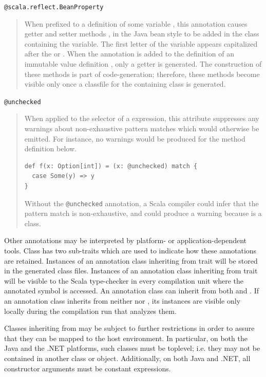 {\lstinline^@scala.reflect.BeanProperty^
\begin{quote}
When prefixed to a definition of some variable , this
annotation causes getter and setter methods , 
in the Java bean style to be added in the class containing the
variable. The first letter of the variable appears capitalized after
the  or . When the annotation is added to the
definition of an immutable value definition , only a getter is
generated. The construction of these methods is part of
code-generation; therefore, these methods become visible only once a
classfile for the containing class is generated.
\end{quote}

\lstinline^@unchecked^
\begin{quote}
When applied to the selector of a \lstinline@match@ expression,
this attribute suppresses any warnings about non-exhaustive pattern
matches which would otherwise be emitted. For instance, no warnings
would be produced for the method definition below.
\begin{lstlisting}
def f(x: Option[int]) = (x: @unchecked) match {
  case Some(y) => y
}
\end{lstlisting}
Without the \lstinline^@unchecked^ annotation, a Scala compiler could
infer that the pattern match is non-exhaustive, and could produce a
warning because \lstinline@Option@ is a \lstinline@sealed@ class.
\end{quote}

Other annotations may be interpreted by platform- or
application-dependent tools. Class  has two
sub-traits which are used to indicate how these annotations are
retained. Instances of an annotation class inheriting from trait
 will be stored in the generated class
files. Instances of an annotation class inheriting from trait
 will be visible to the Scala type-checker
in every compilation unit where the annotated symbol is accessed. An
annotation class can inherit from both 
and . If an annotation class inherits from
neither  nor
, its instances are visible only locally
during the compilation run that analyzes them.

Classes inheriting from  may be
subject to further restrictions in order to assure that they can be
mapped to the host environment. In particular, on both the Java and
the .NET platforms, such classes must be toplevel; i.e. they may not
be contained in another class or object.  Additionally, on both
Java and .NET, all constructor arguments must be constant expressions.

}
